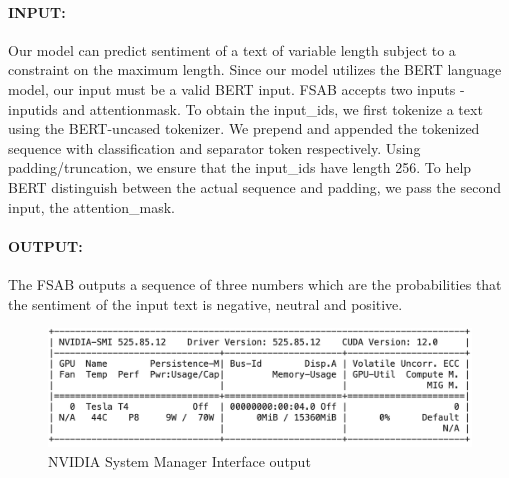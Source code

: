 \documentclass[11pt]{article}
\begin{document}
\paragraph{INPUT:}{Our model can predict sentiment of a text of variable length subject to a constraint on the maximum length. Since our model utilizes the BERT language model, our input must be a valid BERT input. FSAB accepts two inputs - input\textunderscore ids and attention\textunderscore mask. To obtain the input\_ids, we first tokenize a text using the BERT-uncased tokenizer. We prepend and appended the tokenized sequence with classification and separator token respectively. Using padding/truncation, we ensure that the input\_ids have length 256. To help BERT distinguish between the actual sequence and padding, we pass the second input, the attention\_mask. }
\paragraph{OUTPUT:}{The FSAB outputs a sequence of three numbers which are the probabilities that the sentiment of the input text is negative, neutral and positive.}
\begin{figure}[h]
	\centering
	\includegraphics[width = 0.75\linewidth]{graphics/gcolab_runtime.png}
	\caption{NVIDIA System Manager Interface output}
	\label{fig_gcolabruntime}
\end{figure}
\end{document}
